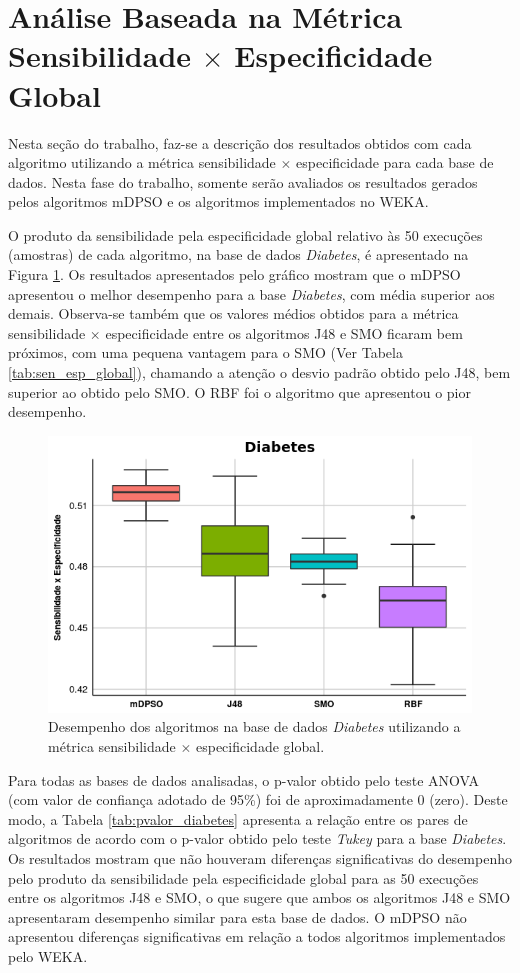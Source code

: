 \documentclass[
	12pt,				%
	openany,			%
	oneside,	
	a4paper,			%
	brazil,				%
	]{unimontes-ppgmsc-abntex2}
\begin{document}
\section{Análise Baseada na Métrica Sensibilidade $\times$ Especificidade Global}
\label{sec:mdpso_analise2}

Nesta seção do trabalho, faz-se a descrição dos resultados obtidos com cada algoritmo utilizando a métrica sensibilidade $\times$ especificidade para cada base de dados. Nesta fase do trabalho, somente serão avaliados os resultados gerados pelos algoritmos mDPSO e os algoritmos implementados no WEKA. 

O produto da sensibilidade pela especificidade global relativo às 50 execuções (amostras) de cada algoritmo, na base de dados {\em Diabetes}, é apresentado na Figura \ref{fig:diabetes}. Os resultados apresentados pelo gráfico mostram que o mDPSO apresentou o melhor desempenho para a base {\em Diabetes}, com média superior aos demais. Observa-se também que os valores médios obtidos para a métrica sensibilidade $\times$ especificidade entre os algoritmos J48 e SMO ficaram bem próximos, com uma pequena vantagem para o SMO (Ver Tabela \ref{tab:sen_esp_global}), chamando a atenção o desvio padrão obtido pelo J48, bem superior ao obtido pelo SMO. O RBF foi o algoritmo que apresentou o pior desempenho.

\begin{figure}[!ht]
\centering
\includegraphics[scale=.7]{graficos/diabetes}
\caption{Desempenho dos algoritmos na base de dados {\em Diabetes} utilizando a métrica sensibilidade $\times$ especificidade global.}
\label{fig:diabetes}
\end{figure}

Para todas as bases de dados analisadas, o p-valor obtido pelo teste ANOVA (com valor de confiança adotado de 95\%) foi de aproximadamente 0 (zero). Deste modo, a Tabela \ref{tab:pvalor_diabetes} apresenta a relação entre os pares de algoritmos de acordo com o p-valor obtido pelo teste {\em Tukey} para a base {\em Diabetes}. Os resultados mostram que não houveram diferenças significativas do desempenho pelo produto da sensibilidade pela especificidade global para as 50 execuções entre os algoritmos J48 e SMO, o que sugere que ambos os algoritmos J48 e SMO apresentaram desempenho similar para esta base de dados. O mDPSO não apresentou diferenças significativas em relação a todos algoritmos implementados pelo WEKA. 
\end{document}
